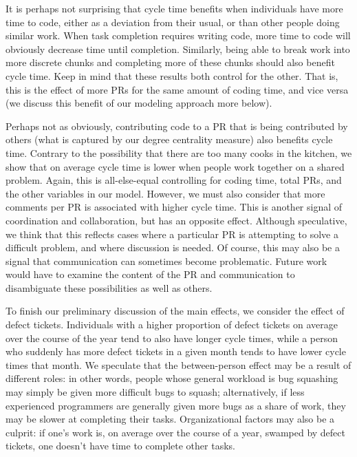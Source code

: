 \documentclass[manuscript,screen,review]{acmart}
\begin{document}
It is perhaps not surprising that cycle time benefits when individuals
have more time to code, either as a deviation from their usual, or than
other people doing similar work. When task completion requires writing
code, more time to code will obviously decrease time until completion.
Similarly, being able to break work into more discrete chunks and
completing more of these chunks should also benefit cycle time. Keep in
mind that these results both control for the other. That is, this is the
effect of more PRs for the same amount of coding time, and vice versa
(we discuss this benefit of our modeling approach more below).

Perhaps not as obviously, contributing code to a PR that is being
contributed by others (what is captured by our degree centrality
measure) also benefits cycle time. Contrary to the possibility that
there are too many cooks in the kitchen, we show that on average cycle
time is lower when people work together on a shared problem. Again, this
is all-else-equal controlling for coding time, total PRs, and the other
variables in our model. However, we must also consider that more
comments per PR is associated with higher cycle time. This is another
signal of coordination and collaboration, but has an opposite effect.
Although speculative, we think that this reflects cases where a
particular PR is attempting to solve a difficult problem, and where
discussion is needed. Of course, this may also be a signal that
communication can sometimes become problematic. Future work would have
to examine the content of the PR and communication to disambiguate these
possibilities as well as others.

To finish our preliminary discussion of the main effects, we consider
the effect of defect tickets. Individuals with a higher proportion of
defect tickets on average over the course of the year tend to also have
longer cycle times, while a person who suddenly has more defect tickets
in a given month tends to have lower cycle times that month. We
speculate that the between-person effect may be a result of different
roles: in other words, people whose general workload is bug squashing
may simply be given more difficult bugs to squash; alternatively, if
less experienced programmers are generally given more bugs as a share of
work, they may be slower at completing their tasks. Organizational
factors may also be a culprit: if one's work is, on average over the
course of a year, swamped by defect tickets, one doesn't have time to
complete other tasks.
\end{document}
